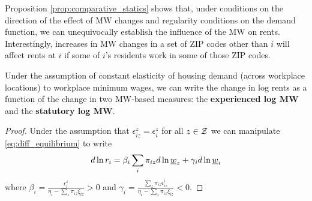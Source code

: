 Proposition \ref{prop:comparative_statics} shows that, under conditions on the 
direction of the effect of MW changes and regularity conditions on the demand 
function, we can unequivocally establish the influence of the MW on rents. 
Interestingly, increases in MW changes in a set of ZIP codes other than $i$
will affect rents at $i$ if some of $i$'s residents work in some of those ZIP codes.

\begin{prop}[Representation]\label{prop:representation}
    Under the assumption of constant elasticity of housing demand (across workplace locations)
    to workplace minimum wages,
    we can write the change in log rents as a function of the change in two 
    MW-based measures: the \textbf{experienced log MW} and the \textbf{statutory 
    log MW}.
\end{prop}
\begin{proof}
    Under the assumption that $\epsilon_{iz}^z = \epsilon_i^z$ for all $z\in\mathcal{Z}$ we can 
    manipulate \eqref{eq:diff_equilibrium} to write
    \begin{equation} \label{eq:theory_represenation}
        d \ln r_i = \beta_i \sum_i \pi_{iz} d\ln \underline{w}_z + \gamma_i d \ln \underline{w}_i
    \end{equation}
    where $\beta_i = \frac{\epsilon_{i}^z}{\eta_{i} - \sum_z \pi_{iz} \xi_{iz}} 
    >0$ and $\gamma_i = \frac{\sum_z \pi_{iz} \epsilon_{iz}^i}{\eta_{i} 
            - \sum_z \pi_{iz} \xi_{iz}} < 0$.
\end{proof}


